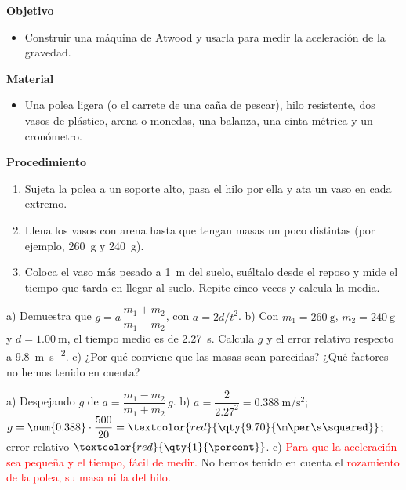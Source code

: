 \noindent\begin{minipage}[t]{0.48\textwidth}
    \textbf{Objetivo}
    \begin{itemize}
        \item Construir una máquina de Atwood y usarla para medir la aceleración de la gravedad.
    \end{itemize}
\end{minipage}\hfill
\begin{minipage}[t]{0.48\textwidth}
    \textbf{Material}
    \begin{itemize}
        \item Una polea ligera (o el carrete de una caña de pescar), hilo resistente, dos vasos de plástico, arena o monedas, una
        balanza, una cinta métrica y un cronómetro.
    \end{itemize}
\end{minipage}

\textbf{Procedimiento}
\begin{enumerate}[label=\numberballgreen]
    \item Sujeta la polea a un soporte alto, pasa el hilo por ella y ata un vaso en cada extremo.
    \item Llena los vasos con arena hasta que tengan masas un poco distintas (por ejemplo, \qty{260}{\g} y \qty{240}{\g}).
    \item Coloca el vaso más pesado a \qty{1}{\m} del suelo, suéltalo desde el reposo y mide el tiempo que tarda en llegar al suelo.
    Repite cinco veces y calcula la media.
\end{enumerate}

\begin{exercise}
    a) Demuestra que \(g = a\,\dfrac{m_1 + m_2}{m_1 - m_2}\), con \(a = 2d/t^2\). b) Con \(m_1 = \qty{260}{\g}\), \(m_2 = \qty{240}{\g}\) y
    \(d = \qty{1.00}{\m}\), el tiempo medio es de \qty{2.27}{\s}. Calcula \(g\) y el error relativo respecto a \qty{9.8}{\m\per\s\squared}.
    c) ¿Por qué conviene que las masas sean parecidas? ¿Qué factores no hemos tenido en cuenta?
    \begin{solu}
        a) Despejando \(g\) de \(a = \dfrac{m_1 - m_2}{m_1 + m_2}\,g\). b) \(a = \dfrac{2}{\num{2.27}^2} = \qty{0.388}{\m\per\s\squared}\);
        \(g = \num{0.388} \cdot \dfrac{500}{20} = \textcolor{red}{\qty{9.70}{\m\per\s\squared}}\); error relativo \(\textcolor{red}{\qty{1}{\percent}}\).
        c) \textcolor{red}{Para que la aceleración sea pequeña y el tiempo, fácil de medir.} No hemos tenido en cuenta el
        \textcolor{red}{rozamiento de la polea, su masa ni la del hilo}.
    \end{solu}
\end{exercise}

